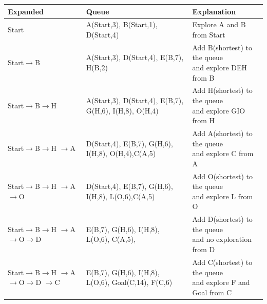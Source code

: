 \documentclass{article}
\begin{document}
        \begin{table}[H]
            \begin{tabular}{l|l|l}
            Expanded                            & Queue                                                  & Explanation                                                \\ \hline
            Start                               & A(Start,3), \textcolor[rgb]{0,1,1}{B(Start,1)}, D(Start,4)  & Explore A and B from Start                                 \\ \hline
            Start$\rightarrow$\textcolor[rgb]{0,1,0}{B}                             & A(Start,3), D(Start,4), E(B,7), \textcolor[rgb]{0,0,1}{H(B,2)}                 & \makecell*[c]{Add B(shortest) to the queue\\ and explore DEH from B}        \\ \hline
            Start$\rightarrow$B$\rightarrow$\textcolor[rgb]{0,0,1}{H}                           & \textcolor[rgb]{1,0,0}{A(Start,3)}, D(Start,4), E(B,7), G(H,6), I(H,8), O(H,4) & \makecell*[c]{Add H(shortest) to the queue\\ and explore GIO from H}        \\ \hline
            \makecell*[c]{Start$\rightarrow$B$\rightarrow$H\\$\rightarrow$\textcolor[rgb]{1,0,0}{A}}                         & D(Start,4), E(B,7), G(H,6), I(H,8), O(H,4),C(A,5)      & \makecell*[c]{Add A(shortest) to the queue\\ and explore C from A}          \\ \hline
            \makecell*[c]{Start$\rightarrow$B$\rightarrow$H\\$\rightarrow$A$\rightarrow$O}                       & D(Start,4), E(B,7), G(H,6), I(H,8), L(O,6),C(A,5)      & \makecell*[c]{Add O(shortest) to the queue\\ and explore L from O}          \\ \hline
            \makecell*[c]{Start$\rightarrow$B$\rightarrow$H\\$\rightarrow$A$\rightarrow$O$\rightarrow$D}                     & E(B,7), G(H,6), I(H,8), L(O,6), \textcolor[rgb]{1,0,0}{C(A,5)},                & \makecell*[c]{Add D(shortest) to the queue\\ and no exploration from D}     \\ \hline
            \makecell*[c]{Start$\rightarrow$B$\rightarrow$H\\$\rightarrow$A$\rightarrow$O$\rightarrow$D\\$\rightarrow$\textcolor[rgb]{1,0,0}{C}}                   & \textcolor[rgb]{0,1,0}{E(B,7)}, G(H,6), I(H,8), L(O,6), Goal(C,14), F(C,6)     & \makecell*[c]{Add C(shortest) to the queue\\ and explore F and Goal from C} \\ \hline

\end{tabular}
\end{table}
\end{document}
